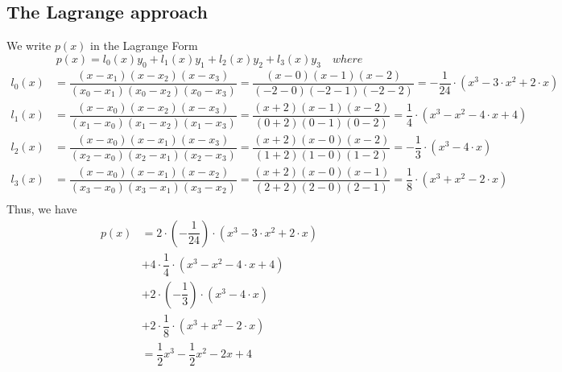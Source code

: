 \documentclass [9 pt]{article}
\theoremstyle{definition}
\begin{document}
\subsection*{The Lagrange approach}
We write $p(x)$ in the Lagrange Form
$$p(x) = l_0(x)y_0 + l_1(x)y_1 + l_2(x)y_2 + l_3(x)y_3 \quad  where  $$
\begin{align*}
	l_0(x) &= \dfrac{(x - x_1)(x - x_2)(x - x_3)}{(x_0 - x_1)(x_0 - x_2)(x_0 - x_3)} = \dfrac{(x - 0)(x - 1)(x - 2)}{(-2 - 0)(-2 - 1)(-2 - 2)} = -\dfrac{1}{24} \cdot ( x^3 - 3\cdot x^2 + 2\cdot x )\\ 
	l_1(x) &= \dfrac{(x - x_0)(x - x_2)(x - x_3)}{(x_1 - x_0)(x_1 - x_2)(x_1 - x_3)} = \dfrac{(x + 2)(x - 1)(x - 2)}{(0 + 2)(0 - 1)(0 - 2)} = \dfrac{1}{4} \cdot ( x^3 -  x^2 - 4\cdot x + 4)\\ 
	l_2(x) &= \dfrac{(x - x_0)(x - x_1)(x - x_3)}{(x_2 - x_0)(x_2 - x_1)(x_2 - x_3)} = \dfrac{(x + 2)(x - 0)(x - 2)}{(1 + 2)(1 - 0)(1 - 2)} = -\dfrac{1}{3} \cdot ( x^3 - 4\cdot x )\\ 
	l_3(x) &= \dfrac{(x - x_0)(x - x_1)(x - x_2)}{(x_3 - x_0)(x_3 - x_1)(x_3 - x_2)} = \dfrac{(x + 2)(x - 0)(x - 1)}{(2 + 2)(2 - 0)(2 - 1)} = \dfrac{1}{8} \cdot ( x^3 + x^2 - 2\cdot x )\\ 
\end{align*}
Thus, we have 
\begin{align*}
	p(x) &= 2 \cdot (-\dfrac{1}{24}) \cdot ( x^3 - 3\cdot x^2 + 2\cdot x )\\ 
		 &+ 4 \cdot \dfrac{1}{4} \cdot ( x^3 -  x^2 - 4\cdot x + 4)\\ 
		 &+ 2 \cdot (-\dfrac{1}{3}) \cdot ( x^3 - 4\cdot x )\\ 
		 &+ 2 \cdot \dfrac{1}{8} \cdot ( x^3 + x^2 - 2\cdot x )\\ 
		 &= \dfrac{1}{2} x^3 - \dfrac{1}{2} x^2 -2x + 4
\end{align*}
\end{document}
